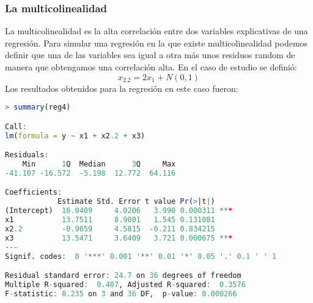 \documentclass[12pt,a4paper]{article}
\begin{document}
\subsubsection{La multicolinealidad}
La multicolinealidad es la alta correlación entre dos variables explicativas de una regresión. Para simular una regresión en la que existe multicolinealidad podemos definir que una de las variables sea igual a otra más unos residuos random de manera que obtengamos una correlación alta. En el caso de estudio se definió:
\begin{equation*}
    x_{2.2} = 2x_1 + N(0,1)
\end{equation*}
Los resultados obtenidos para la regresión en este caso fueron:
\begin{lstlisting}[language=R, caption = Regresión lineal con multicolinealidad, label =cod:5]
> summary(reg4)

Call:
lm(formula = y ~ x1 + x2.2 + x3)

Residuals:
    Min      1Q  Median      3Q     Max 
-41.107 -16.572  -5.198  12.772  64.116 

Coefficients:
            Estimate Std. Error t value Pr(>|t|)    
(Intercept)  16.0409     4.0206   3.990 0.000311 ***
x1           13.7511     8.9001   1.545 0.131081    
x2.2         -0.9659     4.5815  -0.211 0.834215    
x3           13.5471     3.6409   3.721 0.000675 ***
---
Signif. codes:  0 '***' 0.001 '**' 0.01 '*' 0.05 '.' 0.1 ' ' 1

Residual standard error: 24.7 on 36 degrees of freedom
Multiple R-squared:  0.407,	Adjusted R-squared:  0.3576 
F-statistic: 8.235 on 3 and 36 DF,  p-value: 0.000266
\end{lstlisting}
\end{document}
